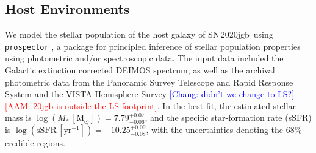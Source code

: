 \documentclass[twocolumn]{aastex631}
\newcommand{\sn}{SN\,2020jgb}
\newcommand{\adam}[1]{\textcolor{red}{[AAM: #1]}}
\newcommand{\chang}[1]{\textcolor{blue}{[Chang: #1]}}
\begin{document}
\subsection{Host Environments} \label{sec:host}
We model the stellar population of the host galaxy of \sn\ using \texttt{prospector} \citep{Johnson_prospector_2021}, a package for principled inference of stellar population properties using photometric and/or spectroscopic data. The input data included the Galactic extinction corrected DEIMOS spectrum, as well as the archival photometric data from the Panoramic Survey Telescope and Rapid Response System \citep[Pan-STARRS;][{\it g, r, i, z, y} Kron magnitudes]{PS1_2016}  and the VISTA Hemisphere Survey \citep[VHS;][J and $\mathrm{K}_\mathrm{s}$ Petrosian magnitudes]{VHS_2013} \chang{didn't we change to LS?} \adam{20jgb is outside the LS footprint}. In the best fit, the estimated stellar mass is $\log (M_*\,[\mathrm{M_\odot}])=7.79_{-0.06}^{+0.07}$, and the specific star-formation rate (sSFR) is $\log (\mathrm{sSFR}\,[\mathrm{yr}^{-1}])=-10.25_{-0.08}^{+0.09}$, with the uncertainties denoting the 68\% credible regions.
\end{document}
